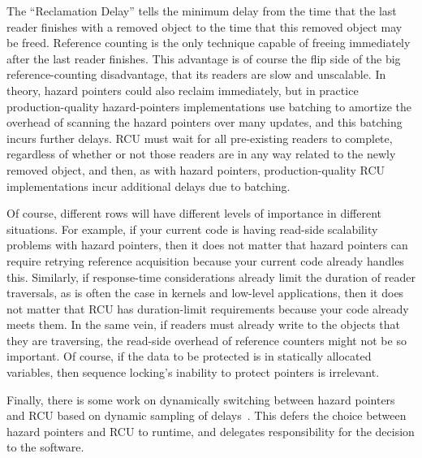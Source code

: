 \QuickQuizEnd

The ``Reclamation Delay'' tells the minimum delay from the time that
the last reader finishes with a removed object to the time that this
removed object may be freed.
Reference counting is the only technique capable of freeing immediately
after the last reader finishes.
This advantage is of course the flip side of the big reference-counting
disadvantage, that its readers are slow and unscalable.
In theory, hazard pointers could also reclaim immediately, but in practice
production-quality hazard-pointers implementations use batching to amortize
the overhead of scanning the hazard pointers over many updates, and this
batching incurs further delays.
RCU must wait for all pre-existing readers to complete, regardless
of whether or not those readers are in any way related to the newly
removed object, and then, as with hazard pointers, production-quality
RCU implementations incur additional delays due to batching.

Of course, different rows will have different levels of importance in
different situations.
For example, if your current code is having read-side scalability problems
with hazard pointers, then it does not matter that hazard pointers can require
retrying reference acquisition because your current code already handles
this.
Similarly, if response-time considerations already limit the duration
of reader traversals, as is often the case in kernels and low-level
applications, then it does not matter that RCU has duration-limit
requirements because your code already meets them.
In the same vein, if readers must already write to the objects that they
are traversing, the read-side overhead of reference counters might
not be so important.
Of course, if the data to be protected is in statically allocated variables,
then sequence locking's inability to protect pointers is irrelevant.

Finally, there is some work on dynamically switching between hazard
pointers and RCU based on dynamic sampling of
delays~\cite{Balmau:2016:FRM:2935764.2935790}.
This defers the choice between hazard pointers and RCU to runtime,
and delegates responsibility for the decision to the software.

